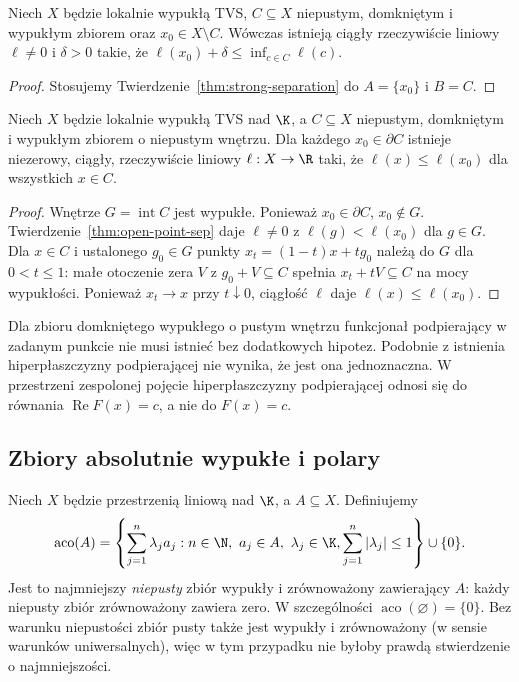 \begin{wniosek}
\label{cor:point-closed-convex}
Niech $X$ będzie lokalnie wypukłą TVS, $C\subseteq X$
niepustym, domkniętym i wypukłym zbiorem oraz
$x_0\in X\setminus C$. Wówczas istnieją
ciągły rzeczywiście liniowy $\ell\ne0$ i $\delta>0$
takie, że $\ell(x_0)+\delta\le\inf_{c\in C}\ell(c)$.
\end{wniosek}
\begin{proof}
Stosujemy Twierdzenie~\ref{thm:strong-separation}
do $A=\{x_0\}$ i $B=C$.
\end{proof}

\begin{twierdzenie}
\label{thm:supporting-hyperplane}
Niech $X$ będzie lokalnie wypukłą TVS nad $\K$,
a $C\subseteq X$ niepustym, domkniętym i wypukłym
zbiorem o niepustym wnętrzu. Dla każdego $x_0\in\partial C$
istnieje niezerowy, ciągły, rzeczywiście liniowy
$\ell:X\to\R$ taki, że $\ell(x)\le\ell(x_0)$
dla wszystkich $x\in C$.
\end{twierdzenie}
\begin{proof}
Wnętrze $G=\operatorname{int} C$ jest wypukłe.
Ponieważ $x_0\in\partial C$, $x_0\notin G$.
Twierdzenie~\ref{thm:open-point-sep} daje $\ell\ne0$
z $\ell(g)<\ell(x_0)$ dla $g\in G$.
Dla $x\in C$ i ustalonego $g_0\in G$ punkty
$x_t=(1-t)x+tg_0$ należą do $G$ dla $0<t\le1$:
małe otoczenie zera $V$ z $g_0+V\subseteq C$
spełnia $x_t+tV\subseteq C$ na mocy wypukłości.
Ponieważ $x_t\to x$ przy $t\downarrow0$, ciągłość
$\ell$ daje $\ell(x)\le\ell(x_0)$.
\end{proof}

\begin{uwaga}
Dla zbioru domkniętego wypukłego o pustym wnętrzu
funkcjonał podpierający w zadanym punkcie nie musi
istnieć bez dodatkowych hipotez. Podobnie z istnienia
hiperpłaszczyzny podpierającej nie wynika, że jest ona
jednoznaczna. W przestrzeni zespolonej pojęcie
hiperpłaszczyzny podpierającej odnosi się do równania
$\operatorname{Re}F(x)=c$, a nie do $F(x)=c$.
\end{uwaga}

\subsection{Zbiory absolutnie wypukłe i polary}

\begin{definicja}
\label{def:absolutely-convex-hull}
Niech $X$ będzie przestrzenią liniową nad $\K$, a $A\subseteq X$.
Definiujemy
\[
\operatorname{aco}(A)=\left\{\sum_{j=1}^n\lambda_j a_j:
 n\in\N,\ a_j\in A,\ \lambda_j\in\K,
 \sum_{j=1}^n|\lambda_j|\le1\right\}\cup\{0\}.
\]
Jest to najmniejszy \emph{niepusty} zbiór wypukły
i zrównoważony zawierający $A$: każdy niepusty zbiór
zrównoważony zawiera zero. W szczególności
$\operatorname{aco}(\varnothing)=\{0\}$.
Bez warunku niepustości zbiór pusty także jest wypukły
i zrównoważony (w sensie warunków uniwersalnych), więc
w tym przypadku nie byłoby prawdą stwierdzenie o najmniejszości.
\end{definicja}

